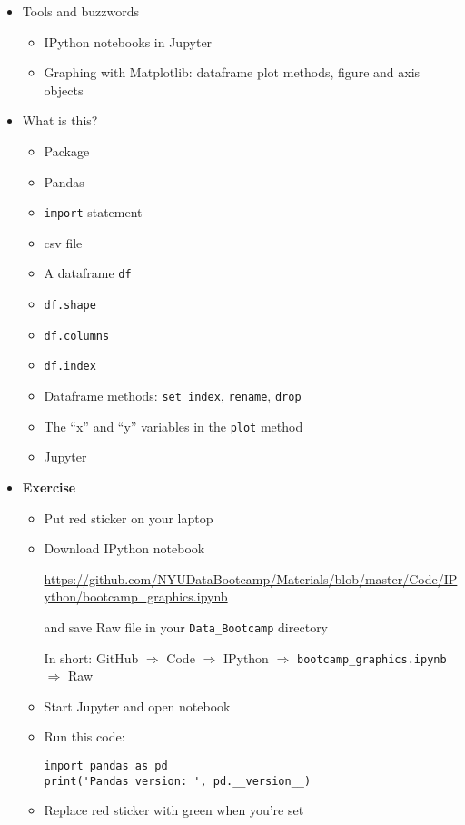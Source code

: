 \documentclass[11pt]{article}
\begin{document}
\begin{itemize}
\item Tools and buzzwords
\begin{itemize}
\item IPython notebooks in Jupyter
\item Graphing with Matplotlib: dataframe plot methods, figure and axis objects
\end{itemize}

\item What is this?
\begin{itemize}
\item Package
\item Pandas
\item {\tt import} statement
\item csv file
\item A dataframe {\tt df}
\item {\tt df.shape}
\item {\tt df.columns}
\item {\tt df.index}
\item Dataframe methods:  \verb|set_index|, {\tt rename}, {\tt drop}
\item The ``x'' and ``y'' variables in the {\tt plot} method
\item Jupyter
\end{itemize}

\item {\bf Exercise}
\begin{itemize}
\item Put red sticker on your laptop

\item Download IPython notebook

\url{https://github.com/NYUDataBootcamp/Materials/blob/master/Code/IPython/bootcamp_graphics.ipynb}

and save Raw file in your \verb|Data_Bootcamp| directory

In short:  GitHub $\Rightarrow$ Code $\Rightarrow$ IPython $\Rightarrow$ \verb|bootcamp_graphics.ipynb|
$\Rightarrow$ Raw

\item Start Jupyter and open notebook
\item Run this code:
\begin{verbatim}
import pandas as pd
print('Pandas version: ', pd.__version__)
\end{verbatim}
\item Replace red sticker with green when you're set
\end{itemize}


\end{itemize}
\end{document}

